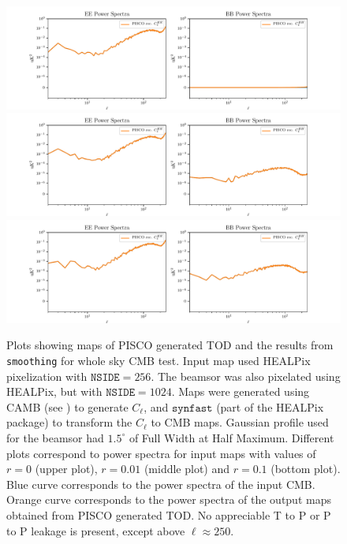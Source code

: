 \documentclass[a4paper,fleqn]{cas-dc}\sloppy
\begin{document}
	\begin{figure}
		\centering
		\includegraphics[width=1\linewidth]{figures/ps_r0d00.pdf}
		\includegraphics[width=1\linewidth]{figures/ps_r0d01.pdf}
		\includegraphics[width=1\linewidth]{figures/ps_r0d10.pdf}
		\caption{Plots showing maps of PISCO generated TOD and the results from \texttt{smoothing} for whole sky CMB test. Input map used HEALPix pixelization with $\mathrm{\texttt{NSIDE}} = 256$. The beamsor was also pixelated using HEALPix, but with $\mathrm{\texttt{NSIDE}} = 1024$. Maps were generated using CAMB (see \cite{Lewis:2002ah}) to generate $C_\ell$, and $\texttt{synfast}$ (part of the HEALPix package) to transform the $C_\ell$ to CMB maps. Gaussian profile used for the beamsor had $1.5^\circ$ of Full Width at Half Maximum. Different plots correspond to power spectra for input maps with values of $r=0$ (upper plot), $r=0.01$ (middle plot) and $r=0.1$ (bottom plot). Blue curve corresponds to the power spectra of the input CMB. Orange curve corresponds to the power spectra of the output maps obtained from PISCO generated TOD. No appreciable T to P or P to P leakage is present, except above $\ell \approx 250$.}
		\label{fig::pisco4wholesky}
	\end{figure}
	
\end{document}
